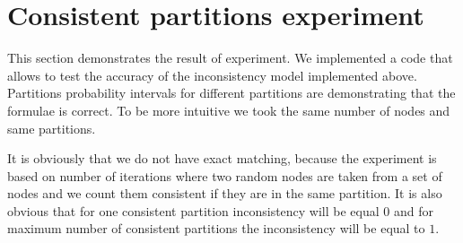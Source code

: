 \documentclass{llncs}
\begin{document}
\section{Consistent partitions experiment}
This section demonstrates the result of experiment. We implemented a code that allows to test the accuracy of the inconsistency model implemented above. Partitions probability intervals for different partitions are demonstrating that
the formulae is correct. To be more intuitive we took the same number of nodes and same partitions.

It is obviously that we do not have exact matching, because the experiment is based on number of iterations where two random nodes are taken from a set of nodes and we count them consistent if they are in the same partition.
It is also obvious that for one consistent partition inconsistency will be equal $0$ and for maximum number of consistent partitions the inconsistency will be equal to $1$.
\end{document}
